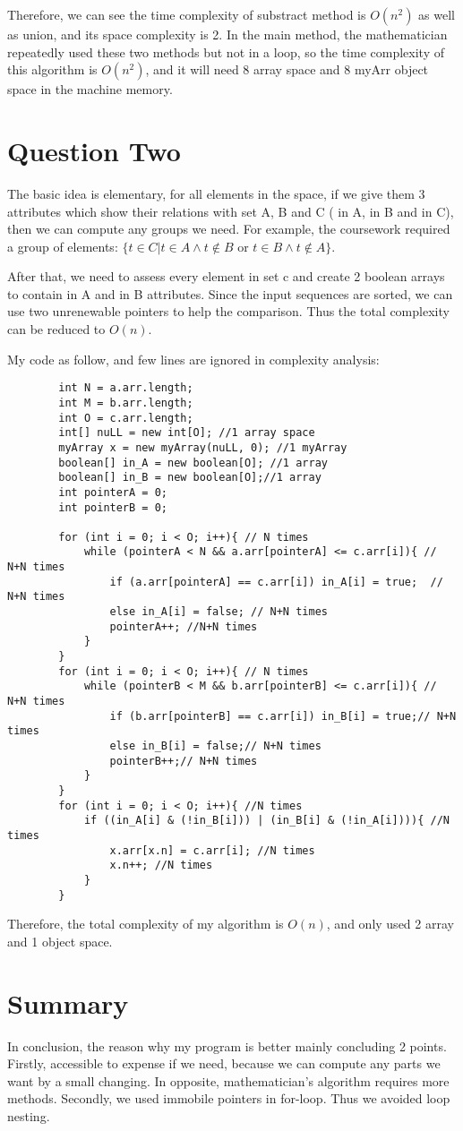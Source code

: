 \documentclass[12pt]{article}
\begin{document}
Therefore, we can see the time complexity of substract method is $O(n^2)$ as well as union, and its space complexity is 2. In the main method, the mathematician repeatedly used these two methods but not in a loop, so the time complexity of this algorithm is $O(n^2)$, and it will need 8 array space and 8 myArr object space in the machine memory.


\section{Question Two}

The basic idea is elementary, for all elements in the space, if we give them 3 attributes which show their relations with set A, B and C ( in A, in B and in C), then we can compute any groups we need. For example, the coursework required a group of elements: $\{ t\in C | t\in A \wedge t\notin B$ or $t\in B \wedge t\notin A \}$.

After that, we need to assess every element in set c and create 2 boolean arrays to contain in A and in B attributes. Since the input sequences are sorted, we can use two unrenewable pointers to help the comparison. Thus the total complexity can be reduced to $O(n)$.

My code as follow, and few lines are ignored in complexity analysis:

\begin{verbatim}
		int N = a.arr.length;
		int M = b.arr.length;
		int O = c.arr.length;
		int[] nuLL = new int[O]; //1 array space
		myArray x = new myArray(nuLL, 0); //1 myArray
		boolean[] in_A = new boolean[O]; //1 array
		boolean[] in_B = new boolean[O];//1 array
		int pointerA = 0;
		int pointerB = 0;
		
		for (int i = 0; i < O; i++){ // N times
			while (pointerA < N && a.arr[pointerA] <= c.arr[i]){ // N+N times
				if (a.arr[pointerA] == c.arr[i]) in_A[i] = true;  // N+N times
				else in_A[i] = false; // N+N times
				pointerA++; //N+N times
			}
		}
		for (int i = 0; i < O; i++){ // N times
			while (pointerB < M && b.arr[pointerB] <= c.arr[i]){ // N+N times
				if (b.arr[pointerB] == c.arr[i]) in_B[i] = true;// N+N times
				else in_B[i] = false;// N+N times
				pointerB++;// N+N times
			}
		}
		for (int i = 0; i < O; i++){ //N times
			if ((in_A[i] & (!in_B[i])) | (in_B[i] & (!in_A[i]))){ //N times
				x.arr[x.n] = c.arr[i]; //N times
				x.n++; //N times
			}
		}
\end{verbatim}
Therefore, the total complexity of my algorithm is $O(n)$, and only used 2 array and 1 object space.
\section{Summary}
In conclusion, the reason why my program is better mainly concluding 2 points. Firstly, accessible to expense if we need, because we can compute any parts we want by a small changing. In opposite, mathematician's algorithm requires more methods. Secondly, we used immobile pointers in for-loop. Thus we avoided loop nesting.
\end{document}
